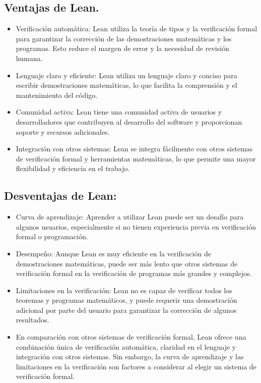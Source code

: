 \documentclass{article}
\begin{document}
\subsection{Ventajas de Lean.}
\begin{itemize}
	\item Verificación automática: Lean utiliza la teoría de tipos y la
	      verificación formal para garantizar la corrección de las
	      demostraciones matemáticas y los programas. Esto reduce el margen de
	      error y la necesidad de revisión humana.

	\item Lenguaje claro y eficiente: Lean utiliza un lenguaje claro y
	      conciso para escribir demostraciones matemáticas, lo que facilita la
	      comprensión y el mantenimiento del código.

	\item Comunidad activa: Lean tiene una comunidad activa de usuarios y
	      desarrolladores que contribuyen al desarrollo del software y
	      proporcionan soporte y recursos adicionales.

	\item Integración con otros sistemas: Lean se integra fácilmente con
	      otros sistemas de verificación formal y herramientas matemáticas, lo
	      que permite una mayor flexibilidad y eficiencia en el trabajo.

\end{itemize}

\subsection{Desventajas de Lean:}
\begin{itemize}
	\item Curva de aprendizaje: Aprender a utilizar Lean puede ser un
	      desafío para algunos usuarios, especialmente si no tienen experiencia
	      previa en verificación formal o programación.

	\item Desempeño: Aunque Lean es muy eficiente en la verificación de
	      demostraciones matemáticas, puede ser más lento que otros sistemas de
	      verificación formal en la verificación de programas más grandes y
	      complejos.

	\item Limitaciones en la verificación: Lean no es capaz de verificar
	      todos los teoremas y programas matemáticos, y puede requerir una
	      demostración adicional por parte del usuario para garantizar la
	      corrección de algunos resultados.

	\item En comparación con otros sistemas de verificación formal, Lean
	      ofrece una combinación única de verificación automática, claridad en
	      el lenguaje y integración con otros sistemas. Sin embargo, la curva de
	      aprendizaje y las limitaciones en la verificación son factores a
	      considerar al elegir un sistema de verificación formal.

\end{itemize}
\end{document}

